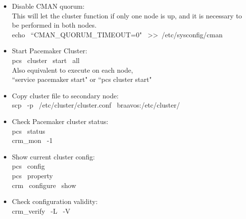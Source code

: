 \documentclass[a4paper, 12pt]{book}
\begin{document}
\begin{itemize}
	\item Disable CMAN quorum:\\
		This will let the cluster function if only one node is up, and it is necessary to be performed in both nodes.\\
		echo \ ``CMAN\_QUORUM\_TIMEOUT=0" \ \textgreater \textgreater \ /etc/sysconfig/cman\\
\end{itemize}


\begin{itemize}
	\item Start Pacemaker Cluster:\\
		pcs \ cluster \ start \ \textminus \textminus all\\
		Also equivalent to execute on each node,\\
		``service pacemaker start" or ``pcs cluster start"\\
\end{itemize}


\begin{itemize}
	\item Copy cluster file to secondary node:\\
		scp \ -p \ /etc/cluster/cluster.conf \ braavos:/etc/cluster/\\
\end{itemize}


\begin{itemize}
	\item Check Pacemaker cluster status:\\
		pcs \ status\\
		crm\_mon \ -1\\
\end{itemize}


\begin{itemize}
	\item Show current cluster config:\\
		pcs \ config\\
		pcs \ property\\
		crm \ configure \ show\\
\end{itemize}


\begin{itemize}
	\item Check configuration validity:\\
		crm\_verify \ -L \ -V\\
\end{itemize}
\end{document}
